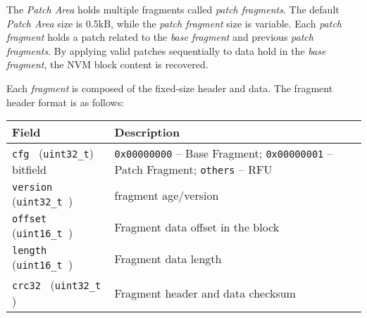 The \textit{Patch Area} holds multiple fragments called \textit{patch fragments}.
The default \textit{Patch Area} size is 0.5kB, while the \textit{patch fragment} size is variable.
Each \textit{patch fragment} holds a patch related to the \textit{base fragment} and previous \textit{patch fragments}.
By applying valid patches sequentially to data hold in the \textit{base fragment}, 
the NVM block content is recovered.

Each \textit{fragment} is composed of the fixed-size header and data. The fragment header format is as follows:

\begin{table*}[!ht]
  \hspace*{0cm}
  \begin{tabular}{| p{5cm} | p{5.5cm} | }
      \hline
      \rowcolor{SeaGreen3!30!} {\bf Field} & {\bf Description} \\
      \hline
      \hline
      {\tt cfg     } ({\tt uint32\_t}) \newline bitfield  & {\tt 0x00000000} -- Base Fragment;\newline
                          {\tt 0x00000001} -- Patch Fragment;\newline
                          {\tt others} -- RFU\\
      \hline
      {\tt version } ({\tt uint32\_t }) & fragment age/version \newline {\tt [1, INT\_MAX]}\\
      \hline
      {\tt offset  } ({\tt uint16\_t })  & Fragment data offset in the block \\
      \hline
      {\tt length  } ({\tt uint16\_t })  & Fragment data length \\
      \hline
      {\tt crc32   } ({\tt uint32\_t })  & Fragment header and data checksum \\
      \hline
  \end{tabular}
  \label{tab:nvmFragmentHeader}
 \end{table*}

\clearpage
 

